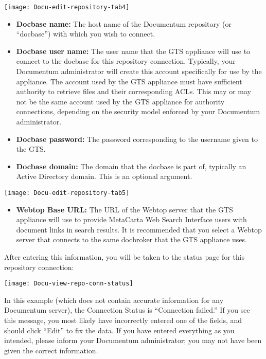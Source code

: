 \texttt{[image: Docu-edit-repository-tab4]}

\begin{itemize}

\item \textbf{Docbase name:} The host name of the Documentum
repository (or ``docbase'') with which you wish to connect.

\item \textbf{Docbase user name:} The user name that the GTS appliance
will use to connect to the docbase for this repository connection.
Typically, your Documentum administrator will create this account
specifically for use by the appliance. The account used by the GTS
appliance must have sufficient authority to retrieve files and their
corresponding ACLs. This may or may not be the same account used by
the GTS appliance for authority connections, depending on the security
model enforced by your Documentum administrator.

\item \textbf{Docbase password:} The password corresponding to the
username given to the GTS.

\item \textbf{Docbase domain:} The domain that the docbase is part of,
typically an Active Directory domain. This is an optional argument.

\end{itemize}

\texttt{[image: Docu-edit-repository-tab5]}

\begin{itemize}

\item \textbf{Webtop Base URL:} The URL of the Webtop server that the
GTS appliance will use to provide MetaCarta Web Search Interface users
with document links in search results. It is recommended that you
select a Webtop server that connects to the same docbroker that the
GTS appliance uses.

\end{itemize}

After entering this information, you will be taken to the status page
for this repository connection:

\texttt{[image: Docu-view-repo-conn-status]}

In this example (which does not contain accurate information for any
Documentum server), the Connection Status is ``Connection failed.''
If you see this message, you most likely have incorrectly entered one
of the fields, and should click ``Edit'' to fix the data. If you have
entered everything as you intended, please inform your Documentum
administrator; you may not have been given the correct information.

